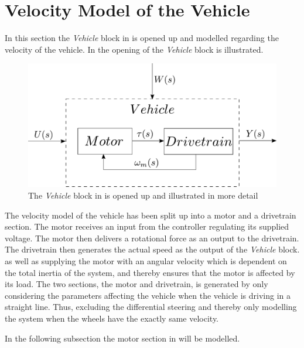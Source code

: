 \section{Velocity Model of the Vehicle}
In this section the \textit{Vehicle} block in   is opened up and modelled regarding the velocity of the vehicle. In  the opening of the \textit{Vehicle} block is illustrated.

\begin{figure}[H]
	\centering
	\includegraphics[scale=0.6]{figures/plantopen.pdf}
	\caption{The \textit{Vehicle} block in   is opened up and illustrated in more detail}
	\label{fig:Velocitymodelplantopen}
\end{figure}

The velocity model of the vehicle has been split up into a motor and a drivetrain section. The motor receives an input from the controller regulating its supplied voltage. The motor then delivers a rotational force as an output to the drivetrain. The drivetrain then generates the actual speed as the output of the \textit{Vehicle} block. as well as supplying the motor with an angular velocity which is dependent on the total inertia of the system, and thereby ensures that the motor is affected by its load. The two sections, the motor and drivetrain, is generated by only considering the parameters affecting the vehicle when the vehicle is driving in a straight line. Thus, excluding the differential steering and thereby only modelling the system when the wheels have the exactly same velocity.

In the following subsection the motor section in  will be modelled.
